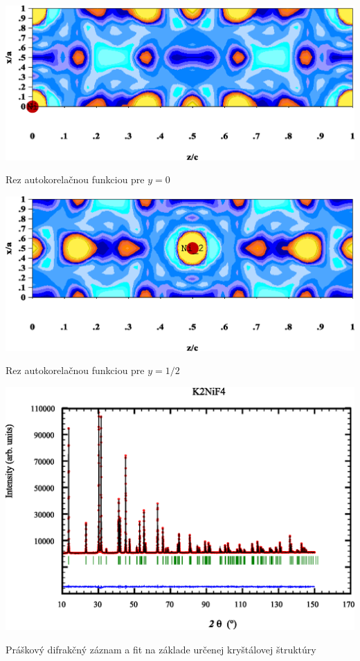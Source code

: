 \documentclass[a4paper, 10pt]{article}
\begin{document}
\begin{graph}[tb]
\centering
\hspace*{-40pt}
\includegraphics[scale=0.8]{data/k2nif4y_0.eps}
\caption{ Rez autokorelačnou funkciou pre $y=0$ \label{graph:rezy0}}
\end{graph}

\begin{graph}[tb]
\centering
\hspace*{-40pt}
\includegraphics[scale=0.8]{data/k2nif4y_05.eps}
\caption{ Rez autokorelačnou funkciou pre $y=1/2$ \label{graph:rezy1/2}}
\end{graph}


\begin{graph}[tb]
\centering
\includegraphics[scale=0.70]{data/vse.eps}
\caption{ Práškový difrakčný záznam a fit na základe určenej kryštálovej štruktúry\label{graph:vse}}
\end{graph}
\end{document}
